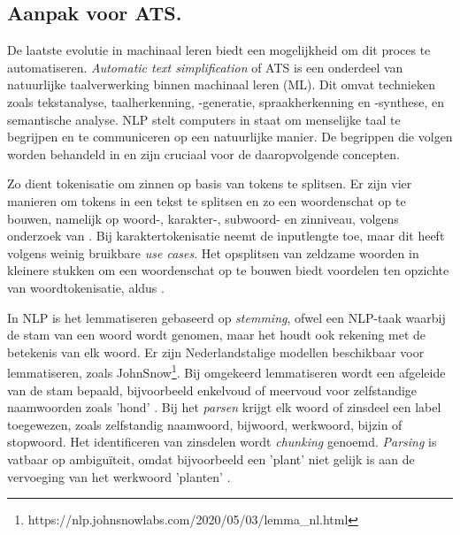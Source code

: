 \subsection{Aanpak voor ATS.}

De laatste evolutie in machinaal leren biedt een mogelijkheid om dit proces te automatiseren. \textit{Automatic text simplification} of ATS is een onderdeel van natuurlijke taalverwerking binnen machinaal leren (ML). Dit omvat technieken zoals tekstanalyse, taalherkenning, -generatie, spraakherkenning en -synthese, en semantische analyse. NLP stelt computers in staat om menselijke taal te begrijpen en te communiceren op een natuurlijke manier. De begrippen die volgen worden behandeld in \textcite{Sohom2019, Eisenstein2019} en zijn cruciaal voor de daaropvolgende concepten.

\medspace

Zo dient tokenisatie om zinnen op basis van tokens te splitsen. Er zijn vier manieren om tokens in een tekst te splitsen en zo een woordenschat op te bouwen, namelijk op woord-, karakter-, subwoord- en zinniveau, volgens onderzoek van \textcite{Menzli2023}. Bij karaktertokenisatie neemt de inputlengte toe, maar dit heeft volgens \textcite{Ribeiro2018} weinig bruikbare \textit{use cases}. Het opsplitsen van zeldzame woorden in kleinere stukken om een woordenschat op te bouwen biedt voordelen ten opzichte van woordtokenisatie, aldus \autocite{Iredale2022}.

\medspace

In NLP is het lemmatiseren gebaseerd op \textit{stemming}, ofwel een NLP-taak waarbij de stam van een woord wordt genomen, maar het houdt ook rekening met de betekenis van elk woord. Er zijn Nederlandstalige modellen beschikbaar voor lemmatiseren, zoals JohnSnow\footnote{https://nlp.johnsnowlabs.com/2020/05/03/lemma\_nl.html}. Bij omgekeerd lemmatiseren wordt een afgeleide van de stam bepaald, bijvoorbeeld enkelvoud of meervoud voor zelfstandige naamwoorden zoals 'hond' \autocite{Eisenstein2019}. Bij het \textit{parsen} krijgt elk woord of zinsdeel een label toegewezen, zoals zelfstandig naamwoord, bijwoord, werkwoord, bijzin of stopwoord. Het identificeren van zinsdelen wordt \textit{chunking} genoemd. \textit{Parsing} is vatbaar op ambiguïteit, omdat bijvoorbeeld een 'plant' niet gelijk is aan de vervoeging van het werkwoord 'planten' \autocite{Eisenstein2019}.

